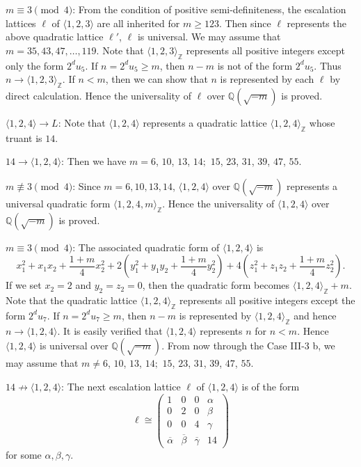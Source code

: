 \documentclass[a4paper,10pt,reqno]{amsart}
\begin{document}
{} $m \equiv 3 \pmod{4}$: From the condition of positive semi-definiteness, the
escalation lattices $\ell$ of ${\langle {1, 2, 3} \rangle}$ are all inherited for $m \ge 123$. Then since $\ell$
represents the above quadratic lattice  $\ell'$, $\ell$ is universal. We may assume that $m = 35,
43, 47, \dotsc, 119$. Note that ${\langle {1,2,3} \rangle}_{\mathbb{Z}}$ represents all positive integers except only the
form $2^d u_5$. If $n=2^d u_5 \ge m$, then $n-m$ is not of the form $2^d u_5$. Thus $n \to
{\langle {1,2,3} \rangle}_{\mathbb{Z}}$. If $n < m$, then we can show that $n$ is represented by each $\ell$ by direct
calculation. Hence the universality of $\ell$ over ${\mathbb{Q}(\sqrt{{-m}})}$ is proved.

{} ${\langle {1,2,4} \rangle} \to L$: Note that ${\langle {1,2,4} \rangle}$ represents a quadratic lattice
${\langle {1,2,4} \rangle}_{\mathbb{Z}}$ whose truant is $14$.

{} $14 \to {\langle {1,2,4} \rangle}$: Then we have $m=6$, $10$, $13$, $14;$ $15$, $23$, $31$, $39$,
$47$, $55$.

{} $m {\not\equiv} 3 \pmod{4}$: Since $m = 6,10,13,14$, ${\langle {1,2,4} \rangle}$ over ${\mathbb{Q}(\sqrt{{-m}})}$
represents a universal quadratic form ${\langle {1,2,4,m} \rangle}_{\mathbb{Z}}$. Hence the universality of ${\langle {1,2,4} \rangle}$
over ${\mathbb{Q}(\sqrt{{-m}})}$ is proved.

{} $m \equiv 3 \pmod{4}$: The associated quadratic form of ${\langle {1,2,4} \rangle}$ is
\[
    x_1^2+x_1x_2+\frac{1+m}4x_2^2 + 2\left(y_1^2+y_1y_2+\frac{1+m}4y_2^2\right) +
    4\left(z_1^2+z_1z_2+\frac{1+m}4z_2^2\right).
\]
If we set $x_2=2$ and $y_2=z_2=0$, then the quadratic form becomes ${\langle {1,2,4} \rangle}_{\mathbb{Z}} + m$. Note that
the quadratic lattice ${\langle {1,2,4} \rangle}_{\mathbb{Z}}$ represents all positive integers except the form $2^{d}u_7$.
If $n = 2^{d} u_7 \ge m$, then $n-m$ is represented by ${\langle {1,2,4} \rangle}_{\mathbb{Z}}$ and hence $n \to
{\langle {1,2,4} \rangle}$. It is easily verified that ${\langle {1,2,4} \rangle}$ represents $n$ for $n < m$. Hence ${\langle {1,2,4} \rangle}$
is universal over ${\mathbb{Q}(\sqrt{{-m}})}$. From now through the Case III-3 b, we may assume that $m \ne 6$, $10$,
$13$, $14;$ $15$, $23$, $31$, $39$, $47$, $55$.

{} $14 \not\to {\langle {1,2,4} \rangle}$: The next escalation lattice $\ell$ of ${\langle {1,2,4} \rangle}$ is of
the form
\[
    \ell \cong
    \begin{pmatrix}
        1 & 0 & 0 & \alpha \\
        0 & 2 & 0 & \beta \\
        0 & 0 & 4 & \gamma \\
        {\overline{{\alpha}}} & {\overline{{\beta}}} & {\overline{{\gamma}}} & 14
    \end{pmatrix}
\]
for some $\alpha, \beta, \gamma$.
\end{document}

